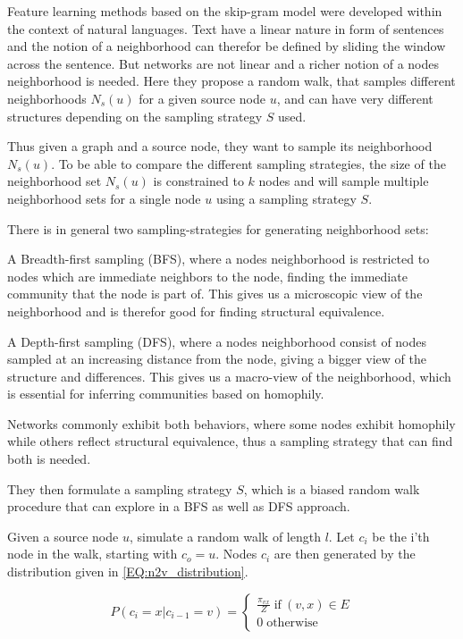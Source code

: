 Feature learning methods based on the skip-gram model were developed within the context of natural languages. Text have a linear nature in form of sentences and the notion of a neighborhood can therefor be defined by sliding the window across the sentence. But networks are not linear and a richer notion of a nodes neighborhood is needed. Here they propose a random walk, that samples different neighborhoods $N_s (u)$ for a given source node $u$, and can have very different structures depending on the sampling strategy $S$ used.

Thus given a graph and a source node, they want to sample its neighborhood $N_s(u)$. To be able to compare the different sampling strategies, the size of the neighborhood set $N_s(u)$ is constrained to $k$ nodes and will sample multiple neighborhood sets for a single node $u$ using a sampling strategy $S$.

There is in general two sampling-strategies for generating neighborhood sets:

A Breadth-first sampling (BFS), where a nodes neighborhood is restricted to nodes which are immediate neighbors to the node, finding the immediate community that the node is part of. This gives us a microscopic view of the neighborhood and is therefor good for finding structural equivalence.

A Depth-first sampling (DFS), where a nodes neighborhood consist of nodes sampled at an increasing distance from the node, giving a bigger view of the structure and differences. This gives us a macro-view of the neighborhood, which is essential for inferring communities based on homophily.

Networks commonly exhibit both behaviors, where some nodes exhibit homophily while others reflect structural equivalence, thus a sampling strategy that can find both is needed.

They then formulate a sampling strategy $S$, which is a biased random walk procedure that can explore in a BFS as well as DFS approach.

Given a source node $u$, simulate a random walk of length $l$. Let $c_i$ be the i'th node in the walk, starting with $c_o = u$. Nodes $c_i$ are then generated by the distribution given in \autoref{EQ:n2v_distribution}.

\begin{equation}\label{EQ:n2v_distribution}
P(c_i = x | c_{i-1} = v) = 
\begin{cases} 
	\frac{\pi_{vx}}{Z}  \; \text{if} \: (v,x) \in E \\
	0 \; \text{otherwise}
\end{cases}
\end{equation}

